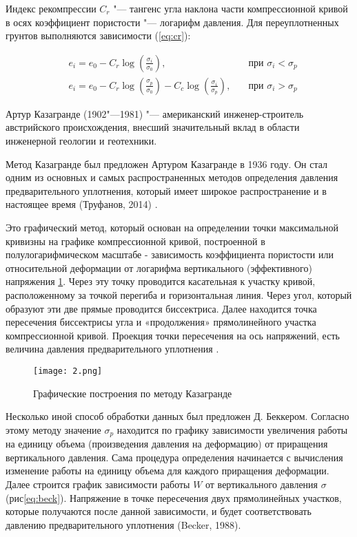  Индекс рекомпрессии $C_r$ "--- тангенс угла наклона части компрессионной кривой в осях коэффициент пористости "--- логарифм давления. Для переуплотненных грунтов выполняются зависимости (\ref{eq:cr}):

\begin{equation}
  \label{eq:cr}
  \begin{alignedat}{2}
  & e_i = e_0 - C_r\log \left(\frac{\sigma_i}{\sigma_0}\right), \quad &\text{при } \sigma_i<\sigma_p \\
  & e_i = e_0 - C_r\log \left(\frac{\sigma_p}{\sigma_0}\right) - C_c\log \left(\frac{\sigma_i}{\sigma_p}\right), \quad &\text{при } \sigma_i>\sigma_p
  \end{alignedat}
\end{equation}


 
 Артур Казагранде (1902"---1981) "--- американский инженер-строитель австрийского происхождения, внесший значительный вклад в области инженерной геологии и геотехники. 
 
 Метод Казагранде был предложен Артуром Казагранде в 1936 году.
 Он стал одним из основных и самых распространенных методов определения давления предварительного уплотнения, который имеет широкое распространение и в настоящее время (Труфанов, 2014) \cite{truf2014}.
 
    

 Это графический метод, который основан на определении точки максимальной кривизны на графике компрессионной кривой, построенной в полулогарифмическом масштабе - зависимость коэффициента пористости или относительной деформации от логарифма вертикального (эффективного) напряжения \ref{eq:caz}. 
 Через эту точку проводится касательная к участку кривой, расположенному за точкой перегиба и горизонтальная линия. 
 Через угол, который образуют эти две прямые проводится биссектриса. 
 Далее находится точка пересечения биссектрисы угла и «продолжения» прямолинейного участка компрессионной кривой. Проекция точки пересечения на ось напряжений, есть величина давления предварительного уплотнения . 

 \begin{figure}[ht]
  \centering
  \label{eq:caz}
  \texttt{[image: 2.png]}
  \caption{Графические построения по методу Казагранде}
\end{figure}
 
Несколько иной способ обработки данных был предложен Д. Беккером. 
Согласно этому методу значение $\sigma_p$ находится по графику зависимости увеличения работы на единицу объема (произведения давления на деформацию) от приращения вертикального давления. 
Сама процедура определения начинается с вычисления изменение работы на единицу объема для каждого приращения деформации. 
Далее строится график зависимости работы $W$ от вертикального давления $\sigma$ (рис\ref{eq:beck}). 
Напряжение в точке пересечения двух прямолинейных участков, которые получаются после данной зависимости, и будет соответствовать давлению предварительного уплотнения (Becker, 1988)\cite{becker1988}.

